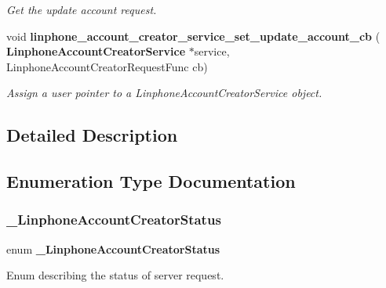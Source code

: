 \begin{DoxyCompactItemize}
\begin{DoxyCompactList}\small\item\em Get the update account request. \end{DoxyCompactList}\item 
void \textbf{ linphone\+\_\+account\+\_\+creator\+\_\+service\+\_\+set\+\_\+update\+\_\+account\+\_\+cb} (\textbf{ Linphone\+Account\+Creator\+Service} $\ast$service, Linphone\+Account\+Creator\+Request\+Func cb)
\begin{DoxyCompactList}\small\item\em Assign a user pointer to a Linphone\+Account\+Creator\+Service object. \end{DoxyCompactList}\end{DoxyCompactItemize}


\subsection{Detailed Description}


\subsection{Enumeration Type Documentation}
\mbox{\label{group__account__creator__request_ga376d528e7e23474a49c50c5aff06b32a}} 
\subsubsection{\+\_\+\+Linphone\+Account\+Creator\+Status}
{\footnotesize\ttfamily enum \textbf{ \+\_\+\+Linphone\+Account\+Creator\+Status}}



Enum describing the status of server request. 

